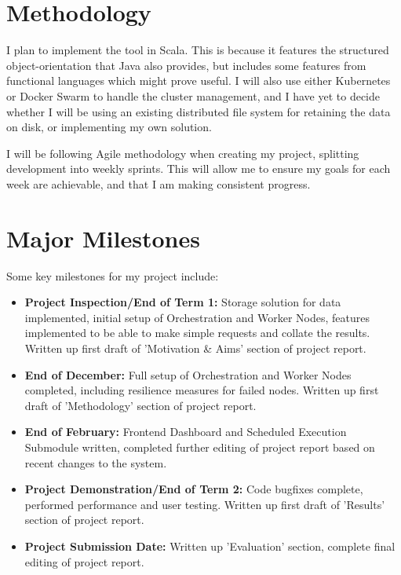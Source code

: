 \documentclass[12pt]{article}
\begin{document}
	\section{Methodology}
	I plan to implement the tool in Scala. This is because it features the structured object-orientation that Java also provides, but includes some features from functional languages which might prove useful.  I will also use either Kubernetes or Docker Swarm to handle the cluster management, and I have yet to decide whether I will be using an existing distributed file system for retaining the data on disk, or implementing my own solution. \medskip
	
	I will be following Agile methodology when creating my project, splitting development into weekly sprints. This will allow me to ensure my goals for each week are achievable, and that I am making consistent progress.
	
	\section{Major Milestones}
	Some key milestones for my project include:
	\begin{itemize}
		\item \textbf{Project Inspection/End of Term 1:} Storage solution for data implemented, initial setup of Orchestration and Worker Nodes, features implemented to be able to make simple requests and collate the results. Written up first draft of 'Motivation \& Aims' section of project report.
		\item \textbf{End of December:} Full setup of Orchestration and Worker Nodes completed, including resilience measures for failed nodes. Written up first draft of 'Methodology' section of project report.
		\item \textbf{End of February:} Frontend Dashboard and Scheduled Execution Submodule written, completed further editing of project report based on recent changes to the system.
		\item \textbf{Project Demonstration/End of Term 2:} Code bugfixes complete, performed performance and user testing. Written up first draft of 'Results' section of project report.
		\item \textbf{Project Submission Date:} Written up 'Evaluation' section, complete final editing of project report.
	\end{itemize}
	
	
\end{document}
